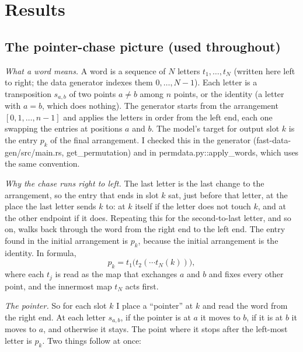\documentclass[paper=a4,fontsize=11pt,DIV=11,parskip=half,headings=small,numbers=noendperiod]{scrartcl}
\DeclareRobustCommand{\code}[1]{{\fontseries{m}\ttfamily #1}}
\begin{document}
\section{Results}\label{sec:3}
\subsection{The pointer-chase picture (used throughout)}\label{sec:3.1}
\emph{What a word means.} A word is a sequence of $N$ letters $t_1,\dots,t_N$ (written here left to right; the
data generator indexes them $0,\dots,N-1$). Each letter is a transposition $s_{a,b}$ of two points $a\ne b$
among $n$ points, or the identity (a letter with $a=b$, which does nothing). The generator starts from the
arrangement $[0,1,\dots,n-1]$ and applies the letters in order from the left end, each one swapping the entries
at positions $a$ and $b$. The model’s target for output slot $k$ is the entry $p_k$ of the final arrangement. I
checked this in the generator
(\code{fast-\allowbreak{}data-\allowbreak{}gen/\allowbreak{}src/\allowbreak{}main.\allowbreak{}rs},
\code{get\_\allowbreak{}permutation}) and in
\code{permdata.\allowbreak{}py::\allowbreak{}apply\_\allowbreak{}words}, which uses the same convention.

\emph{Why the chase runs right to left.} The last letter is the last change to the arrangement, so the entry
that ends in slot $k$ sat, just before that letter, at the place the last letter sends $k$ to: at $k$ itself if
the letter does not touch $k$, and at the other endpoint if it does. Repeating this for the second-to-last
letter, and so on, walks back through the word from the right end to the left end. The entry found in the
initial arrangement is $p_k$, because the initial arrangement is the identity. In formula,
\[ p_k = t_1\bigl(t_2(\cdots t_N(k))\bigr), \]
where each $t_j$ is read as the map that exchanges $a$ and $b$ and fixes every other point, and the innermost
map $t_N$ acts first.

\emph{The pointer.} So for each slot $k$ I place a “pointer” at $k$ and read the word from the right end. At
each letter $s_{a,b}$, if the pointer is at $a$ it moves to $b$, if it is at $b$ it moves to $a$, and otherwise
it stays. The point where it stops after the left-most letter is $p_k$. Two things follow at once:
\end{document}
